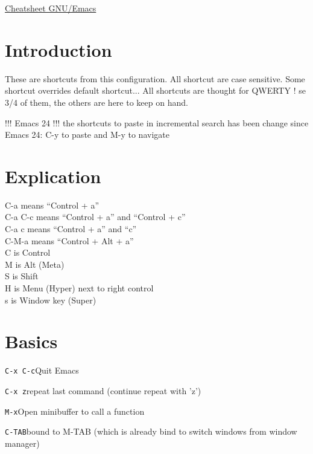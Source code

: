 \documentclass[10pt,landscape]{article}
\def\cm#1#2{{\tt#1}\dotfill#2\par}
\begin{document}
\raggedright
\footnotesize
\begin{multicols}{3}


\setlength{\premulticols}{1pt}
\setlength{\postmulticols}{1pt}
\setlength{\multicolsep}{1pt}
\setlength{\columnsep}{2pt}

\begin{center}
     \Large{\underline{Cheatsheet GNU/Emacs}} \\
\end{center}


\section{Introduction}
These are shortcuts from this configuration.
All shortcut are case sensitive. Some shortcut overrides default shortcut...
All shortcuts are thought for QWERTY !
se 3/4 of them, the others are here to keep on hand.

!!! Emacs 24 !!! the shortcuts to paste in incremental search has been change since Emacs 24: C-y to paste and M-y to navigate

\section{Explication}
C-a means ``Control + a''\\
C-a C-c means ``Control + a'' and ``Control + c''\\
C-a c means ``Control + a'' and ``c''\\
C-M-a means ``Control + Alt + a''\\
C is Control\\
M is Alt (Meta)\\
S is Shift\\
H is Menu (Hyper) next to right control\\
s is Window key (Super)\\






\section{Basics}
\cm{C-x C-c}{Quit Emacs}
\cm{C-x z}{repeat last command (continue repeat with 'z')}
\cm{M-x}{Open minibuffer to call a function}
\cm{C-TAB}{bound to M-TAB (which is already bind to switch windows from window manager)}



\end{multicols}
\end{document}
